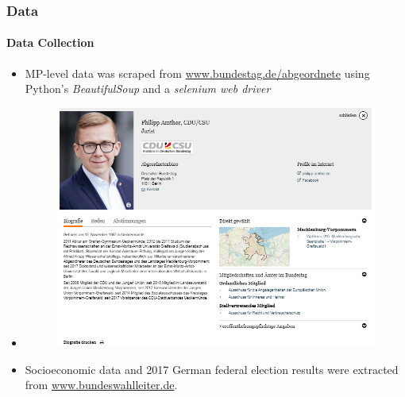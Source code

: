 \documentclass[xcolor=dvipsnames]{beamer}
\begin{document}
\begin{frame}
\frametitle{Data}
\framesubtitle{Data Collection}
\begin{itemize}
\item MP-level data was scraped from \url{www.bundestag.de/abgeordnete} using Python's \textit{BeautifulSoup} and a \textit{selenium web driver}
\item[] 
	\begin{figure}[h!]
  	\centering
  	\includegraphics[scale = 0.42]{../plots/presentation/amthor.png}
	\end{figure}
\item Socioeconomic data and 2017 German federal election results were extracted from \url{www.bundeswahlleiter.de}.
\end{itemize}
\end{frame}
\end{document}
